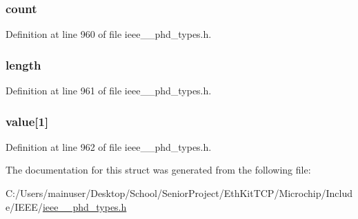 \subsubsection[{count}]{ count}\label{struct___scan_report_info_grouped_list_abf6db060ae8e224764b0f867fb135ecd}


Definition at line 960 of file ieee\+\_\+\_\+phd\+\_\+types.\+h.

\hypertarget{struct___scan_report_info_grouped_list_a3743679e4ff85e3e1b3fc2e59973fbb3}{}
\subsubsection[{length}]{ length}\label{struct___scan_report_info_grouped_list_a3743679e4ff85e3e1b3fc2e59973fbb3}


Definition at line 961 of file ieee\+\_\+\_\+phd\+\_\+types.\+h.

\hypertarget{struct___scan_report_info_grouped_list_afa4932a0557a04358beaf6f7d8a69467}{}
\subsubsection[{value}]{ value\mbox{[}1\mbox{]}}\label{struct___scan_report_info_grouped_list_afa4932a0557a04358beaf6f7d8a69467}


Definition at line 962 of file ieee\+\_\+\_\+phd\+\_\+types.\+h.



The documentation for this struct was generated from the following file\+:\begin{DoxyCompactItemize}
\item 
C\+:/\+Users/mainuser/\+Desktop/\+School/\+Senior\+Project/\+Eth\+Kit\+T\+C\+P/\+Microchip/\+Include/\+I\+E\+E\+E/\hyperlink{ieee__11073__phd__types_8h}{ieee\+\_\+\_\+phd\+\_\+types.\+h}\end{DoxyCompactItemize}
